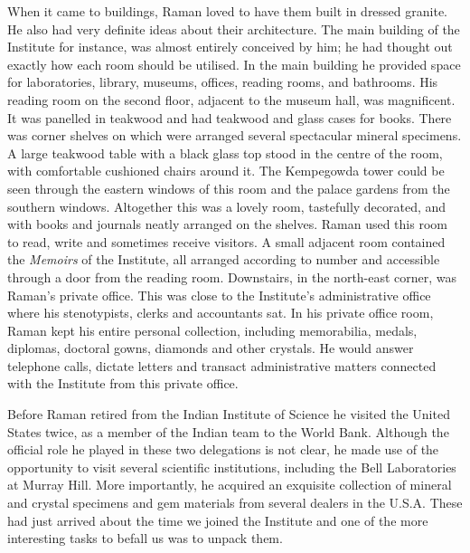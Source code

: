 When it came to buildings, Raman loved to have them built
in dressed granite. He also had very definite ideas about their
architecture. The main building of the Institute for instance, was
almost entirely conceived by him; he had thought out exactly how
each room should be utilised. In the main building he provided
space for laboratories, library, museums, offices, reading rooms,
and bathrooms. His reading room on the second floor, adjacent
to the museum hall, was magnificent. It was panelled in teakwood
and had teakwood and glass cases for books. There was corner
shelves on which were arranged several spectacular mineral
specimens. A large teakwood table with a black glass top stood
in the centre of the room, with comfortable cushioned chairs
around it. The Kempegowda tower could be seen through the
eastern windows of this room and the palace gardens from the
southern windows. Altogether this was a lovely room, tastefully
decorated, and with books and journals neatly arranged on the
shelves. Raman used this room to read, write and sometimes
receive visitors. A small adjacent room contained the {\em Memoirs}
of the Institute, all arranged according to number and accessible
through a door from the reading room. Downstairs, in the north-east 
corner, was Raman's private office. This was close to the
Institute's administrative office where his stenotypists, clerks and
accountants sat. In his private office room, Raman kept his entire
personal collection, including memorabilia, medals, diplomas,
doctoral gowns, diamonds and other crystals. He would answer
telephone calls, dictate letters and transact administrative matters
connected with the Institute from this private office.

Before Raman retired from the Indian Institute of Science
he visited the United States twice, as a member of the Indian team
to the World Bank. Although the official role he played in these
two delegations is not clear, he made use of the opportunity to
visit several scientific institutions, including the Bell Laboratories
at Murray Hill. More importantly, he acquired an exquisite
collection of mineral and crystal specimens and gem materials
from several dealers in the U.S.A. These had just arrived about
the time we joined the Institute and one of the more interesting
tasks to befall us was to unpack them.

